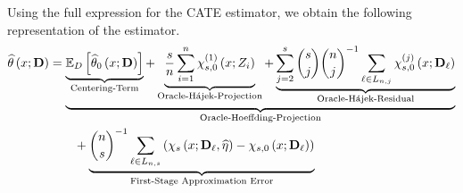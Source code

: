 Using the full expression for the CATE estimator, we obtain the following representation of the estimator.
\begin{equation}\label{eq:DNNDML2_Decomp}
    \begin{aligned}
        \widehat{\theta}\left(x; \mathbf{D}\right)
        & = \underbrace{\underbrace{\mathbb{E}_{D}\left[\widehat{\theta}_{0}\left(x; \mathbf{D}\right)\right]}_{\text{Centering-Term}}
        + \underbrace{\frac{s}{n}\sum_{i = 1}^{n} \chi_{s,0}^{(1)}\left(x; Z_{i}\right)}_{\text{Oracle-H\'ajek-Projection}}
        + \underbrace{\sum_{j = 2}^{s} \binom{s}{j} \binom{n}{j}^{-1}\sum_{\ell \in L_{n,j}} \chi_{s,0}^{(j)}\left(x; \mathbf{D}_{\ell}\right)}_{\text{Oracle-H\'ajek-Residual}}}_{\text{Oracle-Hoeffding-Projection}}\\
        & \quad \quad + \underbrace{\binom{n}{s}^{-1}\sum_{\ell \in L_{n,s}}\left(\chi_{s}\left(x; \mathbf{D}_{\ell}, \widehat{\eta}\right) - \chi_{s,0}\left(x; \mathbf{D}_{\ell}\right)\right)}_{\text{First-Stage Approximation Error}}
    \end{aligned}
\end{equation}
